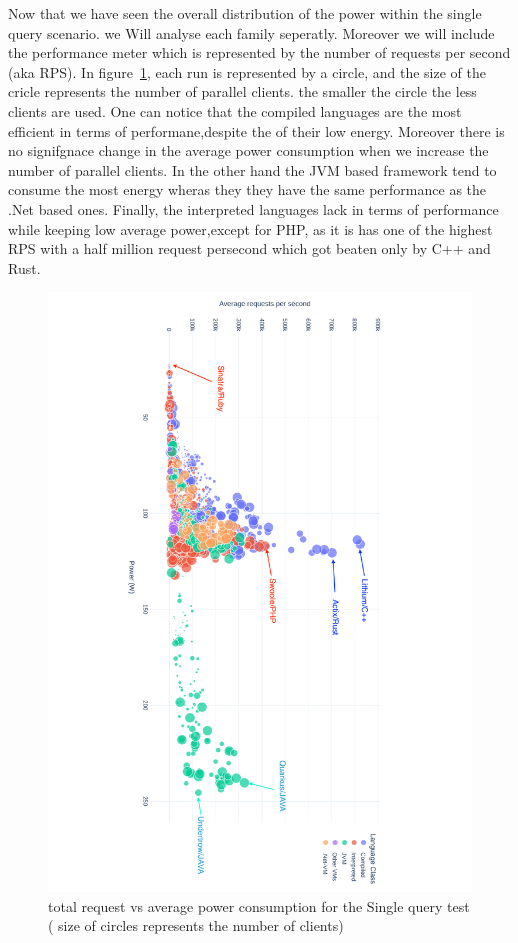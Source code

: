 Now that we have seen the overall distribution of the power within the single query scenario. we Will analyse each family seperatly. Moreover we will include the performance meter which is represented by the number of requests per second (aka RPS).
In figure~\ref{fig:power_requests_db}, each run is represented by a circle, and the size of the cricle represents the number of parallel clients. the smaller the circle the less clients are used.
One can notice that the compiled languages are the most efficient in terms of performane,despite the of their low energy. Moreover there is no signifgnace change in the average power consumption when we increase the number of parallel clients. In the other hand the JVM based framework tend to consume the most energy wheras they they have the same performance as the .Net based ones.
Finally, the interpreted languages lack in terms of performance while keeping low average power,except for PHP, as it is has one of the highest RPS with a half million request persecond which got beaten only by C++ and Rust.


\begin{figure}[hbt]
    \caption{total request vs average power consumption for the Single query test ( size of circles represents the number of clients)}
    \label{fig:power_requests_db}
    \includegraphics[width=
        \columnwidth,angle=9
        0]{imgs/power_requests_db}

\end{figure}

